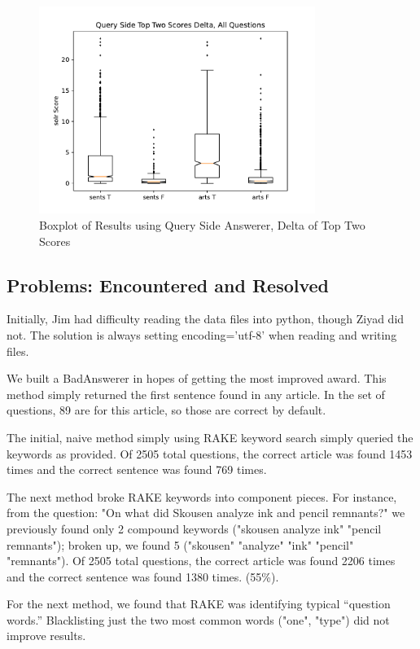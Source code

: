 \documentclass[11pt]{article}
\begin{document}
  \begin{figure}[H]
    \centering
    \includegraphics[width=0.8\textwidth]{fig/bd-all_query.pdf}
    \caption{Boxplot of Results using Query Side Answerer, Delta of Top Two Scores}
    \label{fig:bd-rake}
  \end{figure}


\subsection{Problems: Encountered and Resolved}

Initially, Jim had difficulty reading the data files into python, though Ziyad did not. The solution is always setting encoding='utf-8' when reading and writing files.

We built a BadAnswerer in hopes of getting the most improved award. This method simply returned the first sentence found in any article.  In the set of questions, 89 are for this article, so those are correct by default.

The initial, naive method simply using RAKE keyword search simply queried the keywords as provided. Of 2505 total questions, the correct article was found 1453 times and the correct sentence was found 769 times.

The next method broke RAKE keywords into component pieces. For instance, from the question: "On what did Skousen analyze ink and pencil remnants?" we previously found only 2 compound keywords ("skousen analyze ink" "pencil remnants"); broken up, we found 5 ("skousen" "analyze" "ink" "pencil" "remnants"). Of 2505 total questions, the correct article was found 2206 times and the correct sentence was found 1380 times. (55\%).

For the next method, we found that RAKE was identifying typical ``question words.'' Blacklisting just the two most common words ("one", "type") did not improve results.
\end{document}
